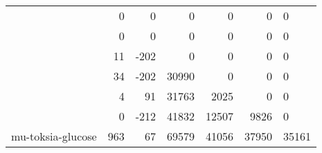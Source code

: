 \begin{tabular}{lrrrrr}
\toprule
{} &   &   &   &   &   &   \\
\midrule
{}            &       0 &       0 &       0 &       0 &       0 &       0 \\
            &       0 &       0 &       0 &       0 &       0 &       0 \\
            &      11 &    -202 &       0 &       0 &       0 &       0 \\
            &      34 &    -202 &   30990 &       0 &       0 &       0 \\
            &       4 &      91 &   31763 &    2025 &       0 &       0 \\
            &       0 &    -212 &   41832 &   12507 &    9826 &       0 \\
mu-toksia-glucose &     963 &      67 &   69579 &   41056 &   37950 &   35161 \\
\bottomrule
\end{tabular}
